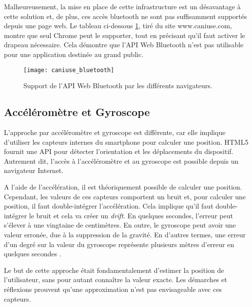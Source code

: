 Malheureusement, la mise en place de cette infrastructure est un désavantage à cette solution et, de plus, ces accès bluetooth ne sont pas suffisamment supportés depuis une page web. Le tableau ci-dessous \ref{caniuse-bluetooth}, tiré du site www.caniuse.com, montre que seul Chrome peut le supporter, tout en précisant qu'il faut activer le drapeau nécessaire. Cela démontre que l'API Web Bluetooth n'est pas utilisable pour une application destinée au grand public.

\begin{figure}[h!]
	\center
	\texttt{[image: caniuse\_bluetooth]}
	\caption{Support de l'API Web Bluetooth par les différents navigateurs.}
	\label{caniuse-bluetooth}
\end{figure}

\subsection{Accéléromètre et Gyroscope}
L'approche par accéléromètre et gyroscope est différente, car elle implique d'utiliser les capteurs internes du smartphone pour calculer une position. HTML5 fournit une API pour détecter l'orientation et les déplacements du dispositif. Autrement dit, l'accès à l'accéléromètre et au gyroscope est possible depuis un navigateur Internet.

A l'aide de l'accélération, il est théoriquement possible de calculer une position. Cependant, les valeurs de ces capteurs comportent un bruit et, pour calculer une position, il faut double-intégrer l'accélération. Cela implique qu'il faut double-intégrer le bruit et cela va créer un \textit{drift}. En quelques secondes, l'erreur peut s'élever à une vingtaine de centimètres. En outre, le gyroscope peut avoir une valeur erronée, due à la suppression de la gravité. En d'autres termes, une erreur d'un degré sur la valeur du gyroscope représente plusieurs mètres d'erreur en quelques secondes \cite{google-SensorFusion}. 

Le but de cette approche était fondamentalement d'estimer la position de l'utilisateur, sans pour autant connaître la valeur exacte. Les démarches et réflexions prouvent qu'une approximation n'est pas envisageable avec ces capteurs.